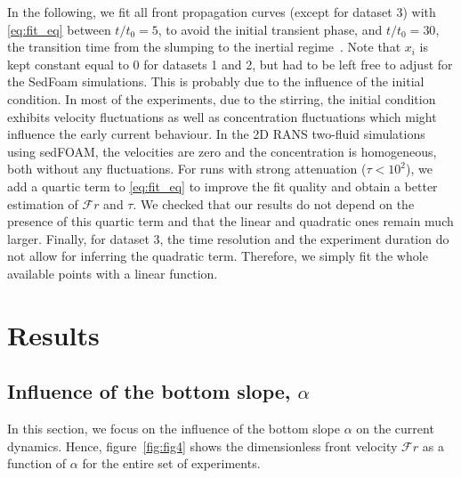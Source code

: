 \documentclass[12pt]{article}
\begin{document}
In the following, we fit all front propagation curves (except for dataset 3) with \eqref{eq:fit_eq} between $t/t_{0} = 5$, to avoid the initial transient phase, and $t/t_{0} = 30$, the transition time from the slumping to the inertial regime~\citep[similar to $X_{\text{t}}/L_{0}\approx 10$ as mentioned in section \ref{sec:intro_lockrelease}; see also e.g.][]{Rottman1983, Sher2015, Ottolenghi2016}. Note that $x_{i}$ is kept constant equal to 0 for datasets 1 and 2, but had to be left free to adjust for the SedFoam simulations. This is probably due to the influence of the initial condition. In most of the experiments, due to the stirring, the initial condition exhibits velocity fluctuations as well as concentration fluctuations which might influence the early current behaviour. In the 2D RANS two-fluid simulations using sedFOAM, the velocities are zero and the concentration is homogeneous, both without any fluctuations. For runs with strong attenuation ($\tau < 10^{2}$), we add a quartic term to \eqref{eq:fit_eq} to improve the fit quality and obtain a better estimation of $\mathcal{F}r$ and $\tau$. We checked that our results do not depend on the presence of this quartic term and that the linear and quadratic ones remain much larger. Finally, for dataset 3, the time resolution and the experiment duration do not allow for inferring the quadratic term. Therefore, we simply fit the whole available points with a linear function.

\section{Results}
\label{sec:results}

\subsection{Influence of the bottom slope, $\alpha$}
\label{sec:influence_slope}

In this section, we focus on the influence of the bottom slope $\alpha$ on the current dynamics. Hence, figure~\ref{fig:fig4} shows the dimensionless front velocity $\mathcal{F}r$ as a function of $\alpha$ for the entire set of experiments.
\end{document}
